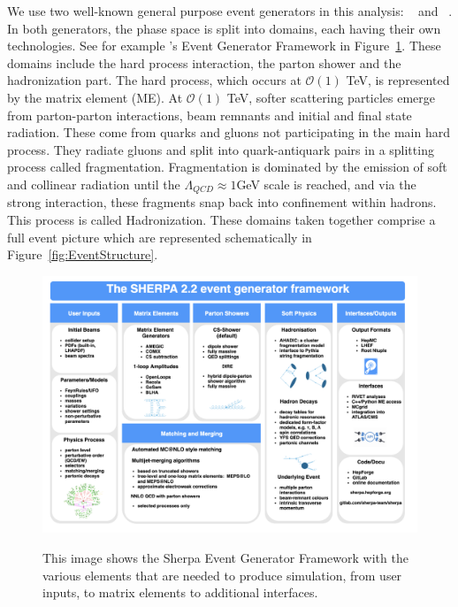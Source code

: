 We use two well-known general purpose event generators in this analysis: \SHERPA~\cite{Gleisberg:2008ta} and ~\cite{bierlich2022comprehensive, Sjostrand:2008za}. In both generators, the phase space is split into domains, each having their own technologies. See for example \SHERPA's Event Generator Framework in Figure~\ref{fig:sherpaDivideAndConquer}. These domains include the hard process interaction, the parton shower and the hadronization part. The hard process, which occurs at $\mathcal{O}(1)$ TeV, is represented by the matrix element (ME). At  $\mathcal{O}(1)$ TeV, softer scattering particles emerge from parton-parton interactions, beam remnants and initial and final state radiation. These come from quarks and gluons not participating in the main hard process. They radiate gluons and split into quark-antiquark pairs in a splitting process called fragmentation. Fragmentation is dominated by the emission of soft and collinear radiation until the $\Lambda_{QCD} \approx 1 $GeV scale is reached, and via the strong interaction, these fragments snap back into confinement within hadrons. This process is called Hadronization. These domains taken together comprise a full event picture which are represented schematically in Figure~\ref{fig:EventStructure}.

\begin{figure}[!htbp]
    \caption{This image shows the Sherpa Event Generator Framework with the various elements that are needed to produce simulation, from user inputs, to matrix elements to additional interfaces.}
	\centering
	\includegraphics[scale=0.5]{fig/SHERPAD&C.png}
	\label{fig:sherpaDivideAndConquer}
\end{figure}

